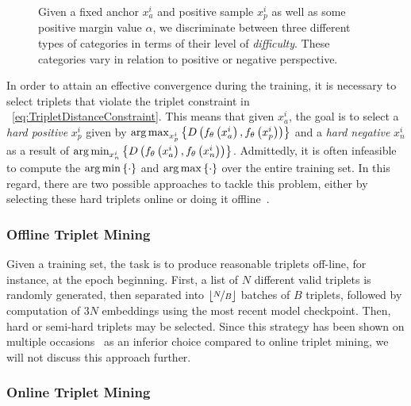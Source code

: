 \begin{figure}[t]
\begin{subfigure}[b]{0.35\textwidth}
        \caption[]{}
    \end{subfigure}
    \caption[Triplet loss categories visualization.]{Given a fixed anchor $x_a^i$ and positive sample $x_p^i$ as well as some positive margin value $\alpha$, we discriminate between three different types of categories in terms of their level of \emph{difficulty}. These categories vary in relation to positive  or negative  perspective.}
    \label{fig:PositiveAndNegativeTripletsCategories}
\end{figure}

In order to attain an effective convergence during the training, it is necessary to select triplets that violate the triplet constraint in \eqtext{}~\ref{eq:TripletDistanceConstraint}. This means that given $x_a^i$, the goal is to select a \emph{hard positive} $x_p^i$ given by $\operatorname*{arg\,max}_{x_p^i}\left\{ {{D} \left( {f_\theta} \left( x_a^i \right), {f_\theta} \left( x_p^i \right) \right)} \right\}$ and a \emph{hard negative} $x_n^i$ as a result of $\operatorname*{arg\,min}_{x_n^i}\left\{ {{D} \left( {f_\theta} \left( x_a^i \right), {f_\theta} \left( x_n^i \right) \right)} \right\}$. Admittedly, it is often infeasible to compute the $\operatorname*{arg\,min}\left\{ {\cdot} \right\}$ and $\operatorname*{arg\,max}\left\{ {\cdot} \right\}$ over the entire training set. In this regard, there are two possible approaches to tackle this problem, either by selecting these hard triplets online or doing it offline~\cite{schroff2015facenet}.

\subsubsection{Offline Triplet Mining}

Given a training set, the task is to produce reasonable triplets off-line, for instance, at the epoch beginning. First, a list of $N$ different valid triplets is randomly generated, then separated into $\lfloor \nicefrac{N}{B} \rfloor$ batches of $B$ triplets, followed by computation of $3N$ embeddings using the most recent model checkpoint. Then, hard or semi-hard triplets may be selected. Since this strategy has been shown on multiple occasions~\cite{schroff2015facenet, hermans2017triplet, kuma2019vehiclereid} as an inferior choice compared to online triplet mining, we will not discuss this approach further.

\subsubsection{Online Triplet Mining}

